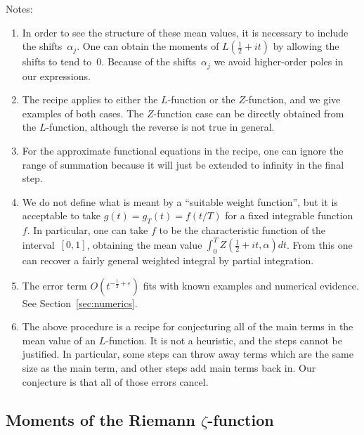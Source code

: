 \documentclass[12pt,letterpaper]{amsart}
\theoremstyle{plain}
\theoremstyle{definition}
\theoremstyle{remark}
\numberwithin{equation}{subsection}
\numberwithin{theorem}{subsection}
\numberwithin{table}{subsection}
\begin{document}
Notes:
\begin{enumerate}
\item In order to see the structure of these mean values, it is necessary 
to include the shifts~$\alpha_j$.  
One can obtain the moments of $L(\frac12 +it)$ by allowing the
shifts to tend to~$0$.  Because of the shifts~$\alpha_j$ we avoid
higher-order poles in our expressions.

\item The recipe applies to either the $L$-function or the $Z$-function,
and we give examples of both cases.  The $Z$-function case can be directly
obtained from the $L$-function, although the reverse is not true in general.

\item For the approximate functional equations in  the recipe, one can ignore
the range of summation because it will just be extended to infinity
in the final step.

\item We do not define what is meant by a ``suitable weight function'',
but it is acceptable to take $g(t)=g_T(t)=f(t/T)$ for a fixed
integrable function~$f$.  In particular, one can take 
$f$ to be the characteristic function of the interval~$[0,1]$,
obtaining the mean value $\int_0^T Z(\tfrac12+it,\alpha)dt$.
From this one can recover a fairly general weighted integral
by partial integration.

\item The error term $O(t^{-\frac12 + \varepsilon})$ fits
with known examples and numerical evidence.  See Section~\ref{sec:numerics}.

\item The above procedure is a recipe for conjecturing 
all of the main terms in the mean value of an $L$-function.  
It is not a heuristic, and the steps cannot be justified.
In particular, some steps can throw away terms which are the same size 
as the main term, and other steps add main terms back in.  Our 
conjecture is that all of those errors cancel.

\end{enumerate}






\subsection{  Moments of the Riemann $\zeta$-function
}\label{sec:zetameanvalues}
\end{document}
